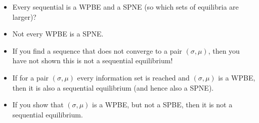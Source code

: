 \documentclass[letter, 10pt]{article}
\begin{document}
\begin{spacing}{1.1}
\begin{itemize}
\item Every sequential is a WPBE and a SPNE (so which sets of equilibria
  are larger)?
\item Not every WPBE is a SPNE.
\item If you find a sequence that does not converge to a pair $(\sigma,
  \mu)$, then you have not shown this is not a sequential equilibrium!
\item If for a pair $(\sigma, \mu)$ every information set is reached and
  $(\sigma, \mu)$ is a WPBE, then it is also a sequential equilibrium (and
  hence also a SPNE).
\item If you show that $(\sigma, \mu)$ is a WPBE, but not a SPBE, then it
  is not a sequential equilibrium.
\end{itemize}

\end{spacing}
\end{document}
